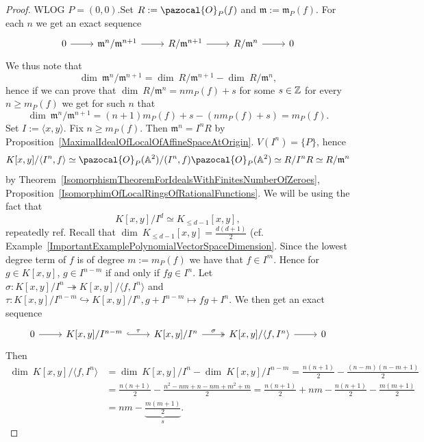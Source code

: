     \begin{proof}
        WLOG $P=(0,0)$.Set $R:=\pazocal{O}_P(f)$ and $\mathfrak{m}:=\mathfrak{m}_P(f)$. For each $n$ we get an exact sequence 
        $$\begin{tikzcd}
            0 \arrow[r] & \mathfrak{m}^{n}/\mathfrak{m}^{n+1} \arrow[r] & R/\mathfrak{m}^{n+1} \arrow[r] &R/\mathfrak{m}^n \arrow[r] &0
        \end{tikzcd}$$
        We thus note that 
        $$\dim\ \mathfrak{m}^{n}/\mathfrak{m}^{n+1} = \dim \ R/\mathfrak{m}^{n+1} - \dim \ R/\mathfrak{m}^n,$$
        hence if we can prove that $\dim \ R/\mathfrak{m}^n = nm_P(f)+s$ for some $s\in \mathbb{Z}$ for every $n\geq m_P(f)$ we get for such $n$ that 
        $$\dim\ \mathfrak{m}^{n}/\mathfrak{m}^{n+1} = (n+1)m_P(f)+s-(nm_P(f)+s)=m_P(f).$$
        Set $I:=\langle x,y\rangle$. Fix $n\geq m_P(f)$. Then $\mathfrak{m}^n = I^nR$ by Proposition~\ref{MaximalIdealOfLocalOfAffineSpaceAtOrigin}. $V(I^n)=\{P\}$, hence 
        $$K[x,y]/\langle I^n, f\rangle \simeq \pazocal{O}_P(\A^2)/(I^n,f)\pazocal{O}_P(\A^2)\simeq R/I^nR\simeq R/\mathfrak{m}^n$$
       by Theorem~\ref{IsomorphismTheoremForIdealsWithFinitesNumberOfZeroes}, Proposition~\ref{IsomorphimOfLocalRingsOfRationalFunctions}. We will be using the fact that 
        $$K[x,y]/I^d \simeq K_{\leq d-1}[x,y],$$
        repeatedly {\large ref}. Recall that $\dim\ K_{\leq d-1}[x,y] = \frac{d(d+1)}{2}$ (cf. Example~\ref{ImportantExamplePolynomialVectorSpaceDimension}.  Since the lowest degree term of $f$ is of degree $m:= m_P(f)$ we have that $f\in I^m$. Hence for $g\in K[x,y]$, $g\in I^{n-m}$ if and only if $fg \in I^n$. Let $\sigma : K[x,y]/I^n \twoheadrightarrow K[x,y]/\langle f,I^n\rangle$ and $\tau: K[x,y]/I^{n-m} \hookrightarrow K[x,y]/I^n, g + I^{n-m}\mapsto fg+I^n$. We then get an exact sequence 
        $$\begin{tikzcd}
            0 \arrow[r] & K[x,y]/I^{n-m} \arrow[r,"\tau", hookrightarrow] & K[x,y]/I^n \arrow[r, "\sigma", twoheadrightarrow] & K[x,y]/\langle f,I^n\rangle \arrow[r] & 0
        \end{tikzcd}$$
        Then 
        \begin{align*} 
            \dim \ K[x,y]/\langle f,I^n\rangle &= \dim \ K[x,y]/I^n-\dim \ K[x,y]/I^{n-m} =  \frac{n(n+1)}{2}-\frac{(n-m)(n-m+1)}{2}\\ 
            &=  \frac{n(n+1)}{2}- \frac{n^2-nm+n-nm+m^2+m}{2} = \frac{n(n+1)}{2} +nm -\frac{n(n+1)}{2}-\frac{m(m+1)}{2}\\ 
            &= nm - \underbrace{\frac{m(m+1)}{2}}_s.\end{align*}
    \end{proof}
